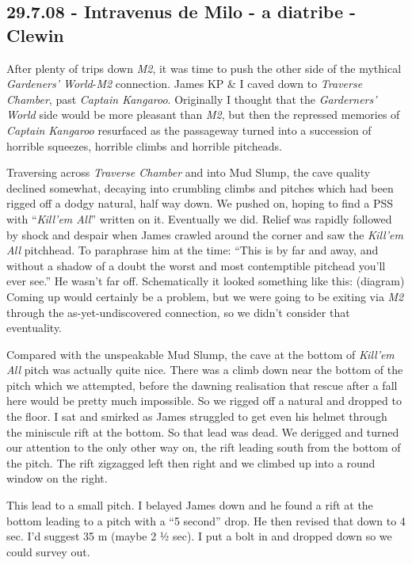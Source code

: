 \hypertarget{intravenus-de-milo---a-diatribe---clewin}{%
\subsection{29.7.08 - Intravenus de Milo - a diatribe -
Clewin}\label{intravenus-de-milo---a-diatribe---clewin}}

After plenty of trips down \emph{M2}, it was time to push the other side
of the mythical \emph{Gardeners' World}-\emph{M2} connection. James KP
\& I caved down to \emph{Traverse Chamber}, past \emph{Captain
Kangaroo}. Originally I thought that the \emph{Garderners' World} side
would be more pleasant than \emph{M2}, but then the repressed memories
of \emph{Captain Kangaroo} resurfaced as the passageway turned into a
succession of horrible squeezes, horrible climbs and horrible pitcheads.

Traversing across \emph{Traverse Chamber} and into Mud Slump, the cave
quality declined somewhat, decaying into crumbling climbs and pitches
which had been rigged off a dodgy natural, half way down. We pushed on,
hoping to find a PSS with ``\emph{Kill'em All}'' written on it.
Eventually we did. Relief was rapidly followed by shock and despair when
James crawled around the corner and saw the \emph{Kill'em All}
pitchhead. To paraphrase him at the time: ``This is by far and away, and
without a shadow of a doubt the worst and most contemptible pitchead
you'll ever see.'' He wasn't far off. Schematically it looked something
like this: (diagram) Coming up would certainly be a problem, but we were
going to be exiting via \emph{M2} through the as-yet-undiscovered
connection, so we didn't consider that eventuality.

Compared with the unspeakable Mud Slump, the cave at the bottom of
\emph{Kill'em All} pitch was actually quite nice. There was a climb down
near the bottom of the pitch which we attempted, before the dawning
realisation that rescue after a fall here would be pretty much
impossible. So we rigged off a natural and dropped to the floor. I sat
and smirked as James struggled to get even his helmet through the
miniscule rift at the bottom. So that lead was dead. We derigged and
turned our attention to the only other way on, the rift leading south
from the bottom of the pitch. The rift zigzagged left then right and we
climbed up into a round window on the right.

This lead to a small pitch. I belayed James down and he found a rift at
the bottom leading to a pitch with a ``5 second'' drop. He then revised
that down to 4 sec. I'd suggest 35 m (maybe 2 ½ sec). I put a bolt in
and dropped down so we could survey out.

